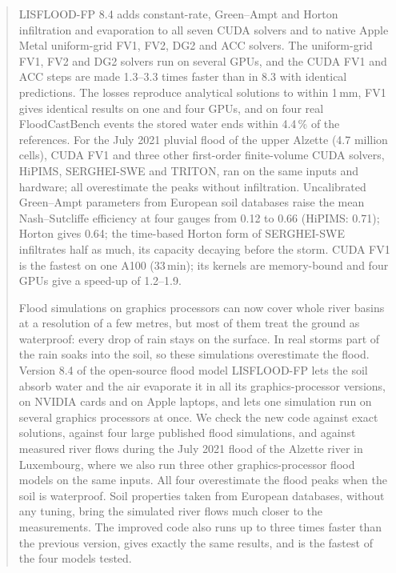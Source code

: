 \documentclass[draft,linenumbers]{agujournal2025}
\begin{document}
\begin{abstract}
LISFLOOD-FP 8.4 adds constant-rate, Green--Ampt and Horton infiltration and
evaporation to all seven CUDA solvers and to native Apple Metal uniform-grid
FV1, FV2, DG2 and ACC solvers. The uniform-grid FV1, FV2 and DG2 solvers run on several
GPUs, and the CUDA FV1 and ACC steps are made 1.3--3.3 times faster than in
8.3 with identical predictions. The losses reproduce analytical solutions to within
1\,mm, FV1 gives identical results on one and four GPUs, and on four real
FloodCastBench events the stored water ends within 4.4\,\% of the references.
For the July 2021 pluvial flood of the upper Alzette (4.7 million cells),
CUDA FV1 and three other first-order finite-volume CUDA solvers, HiPIMS,
SERGHEI-SWE and TRITON, ran on the same inputs and hardware; all overestimate
the peaks without infiltration. Uncalibrated Green--Ampt parameters from
European soil databases raise the mean Nash--Sutcliffe efficiency at four
gauges from 0.12 to 0.66 (HiPIMS: 0.71); Horton gives 0.64; the time-based
Horton form of SERGHEI-SWE infiltrates half as much, its capacity decaying
before the storm. CUDA FV1 is the fastest on one A100 (33\,min); its kernels
are memory-bound and four GPUs give a speed-up of 1.2--1.9.
\begin{plainlanguagesummary}
Flood simulations on graphics processors can now cover whole river basins at a resolution of a few metres, but most of them treat the ground as waterproof: every drop of rain stays on the surface. In real storms part of the rain soaks into the soil, so these simulations overestimate the flood. Version 8.4 of the open-source flood model LISFLOOD-FP lets the soil absorb water and the air evaporate it in all its graphics-processor versions, on NVIDIA cards and on Apple laptops, and lets one simulation run on several graphics processors at once. We check the new code against exact solutions, against four large published flood simulations, and against measured river flows during the July 2021 flood of the Alzette river in Luxembourg, where we also run three other graphics-processor flood models on the same inputs. All four overestimate the flood peaks when the soil is waterproof. Soil properties taken from European databases, without any tuning, bring the simulated river flows much closer to the measurements. The improved code also runs up to three times faster than the previous version, gives exactly the same results, and is the fastest of the four models tested.
\end{plainlanguagesummary}
\end{abstract}
\end{document}
